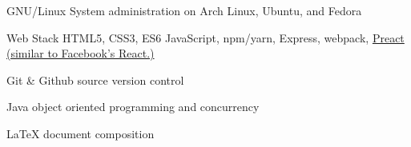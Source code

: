 

\begin{cvskills}

  \cvskill
    {GNU/Linux} %
    {System administration on Arch Linux, Ubuntu, and Fedora} %

  \cvskill
    {Web Stack} %
    {HTML5, CSS3, ES6 JavaScript, npm/yarn, Express, webpack, \href{https://preactjs.com/}{Preact (similar to Facebook's React.)}} %

  \cvskill
    {Git \& Github} %
    {source version control} %

  \cvskill
    {Java} %
    {object oriented programming and concurrency} %

  \cvskill
    {LaTeX} %
    {document composition} %

\end{cvskills}
